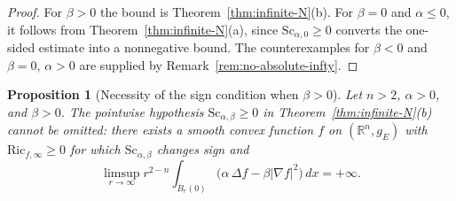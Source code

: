 \documentclass[12pt,oneside,a4paper]{article}
\newtheorem{proposition}[definition]{Proposition}
\theoremstyle{mytheorem}
\theoremstyle{remark}
\begin{document}
\begin{proof}
For $\beta>0$ the bound is Theorem~\ref{thm:infinite-N}\textup{(b)}.
For $\beta=0$ and $\alpha\le 0$, it follows from
Theorem~\ref{thm:infinite-N}\textup{(a)}, since $\mathrm{Sc}_{\alpha,0}\ge 0$
converts the one-sided estimate into a nonnegative bound.
The counterexamples for $\beta<0$ and $\beta=0$, $\alpha>0$ are supplied
by Remark~\ref{rem:no-absolute-infty}.
\end{proof}


\begin{proposition}[Necessity of the sign condition when $\beta>0$]
\label{prop:sign-needed-beta-positive}
Let $n>2$, $\alpha>0$, and $\beta>0$. The pointwise hypothesis
$\mathrm{Sc}_{\alpha,\beta}\ge 0$ in Theorem~\ref{thm:infinite-N}\textup{(b)}
cannot be omitted: there exists a smooth convex function $f$ on
$(\mathbb{R}^n,g_{E})$ with $\mathrm{Ric}_{f,\infty}\ge 0$
for which $\mathrm{Sc}_{\alpha,\beta}$ changes sign and
\[
  \limsup_{r\to\infty}r^{2-n}
  \int_{B_r(0)}\bigl(\alpha\,\Delta f-\beta|\nabla f|^2\bigr)\,dx=+\infty.
\]
\end{proposition}
\end{document}
